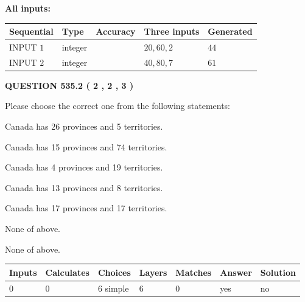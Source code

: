 \documentclass[12pt]{article}
\begin{document}
   
   
   
\noindent\vspace{0.1in}\hspace{-0.08in} {\textbf{\Large{All inputs: }}}
   
   
  
  
\noindent\begin{tabular}{|l|l|l|l|l|}
\hline
 Sequential & Type & Accuracy & Three inputs & Generated \\ 
\hline
 
 
  INPUT $  1 $ & integer &  & $
 20
 , 
 60
 , 
 2
 $ & $ 44 $ 
 \\  \hline  
 
 
  INPUT $  2 $ & integer &  & $
 40
 , 
 80
 , 
 7
 $ & $ 61 $ 
 \\  \hline  
 \end{tabular}
   
   
  
\vspace{0.2in}
  
{\textbf{\Large{QUESTION
535.2 
 ( 2 , 2 , 3 )
}}}
  
  
Please choose the correct one from the following statements:
 
 
Canada has  26 provinces and  5 territories.
 
 
Canada has  15 provinces and  74 territories.
 
 
Canada has   4 provinces and  19 territories.
 
 
Canada has  13 provinces and  8 territories.
 
 
Canada has  17 provinces and  17 territories.
 
 
 None of above.
 
 
\noindent{}
 
 
 None of above.
 
 
\noindent{}
 
 
   
   
   
   
\noindent\begin{tabular}{|l|l|l|l|l|l|l|}
 \hline
Inputs & Calculates & Choices & Layers & Matches & Answer & Solution \\ \hline
 0  & 
 0  & 
 6
  simple  
  & 
 6  & 
 0  & 
  yes & 
  no 
  \\ \hline
 \end{tabular}
   
\end{document}
